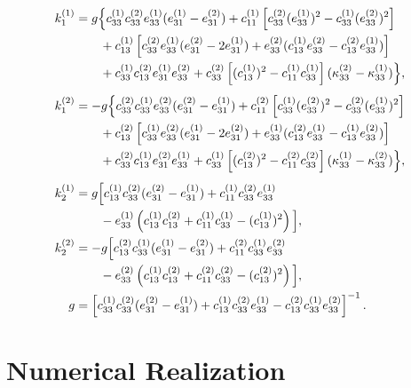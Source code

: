 \begin{align*}
    k_{1}^{(1)} &= g \Big\{
    c_{33}^{(1)} c_{33}^{(2)} e_{33}^{(1)} (e_{31}^{(1)} - e_{31}^{(2)})
    + c_{11}^{(1)} \left[ c_{33}^{(2)} (e_{33}^{(1)})^2 - c_{33}^{(1)} (e_{33}^{(2)})^2 \right]
    \\
    &\qquad + c_{13}^{(1)} \left[
    c_{33}^{(2)} e_{33}^{(1)} (e_{31}^{(2)} - 2 e_{31}^{(1)})
    + e_{33}^{(2)} (c_{13}^{(1)} e_{33}^{(2)} - c_{13}^{(2)} e_{33}^{(1)})
    \right]
    \\
    &\qquad + c_{33}^{(1)} c_{13}^{(2)} e_{31}^{(1)} e_{33}^{(2)}
    + c_{33}^{(2)} \left[ (c_{13}^{(1)})^2 - c_{11}^{(1)} c_{33}^{(1)} \right]
    (\kappa_{33}^{(2)} - \kappa_{33}^{(1)})
    \Big\},
    \\[1ex]
    k_{1}^{(2)} &= -g \Big\{
    c_{33}^{(2)} c_{33}^{(1)} e_{33}^{(2)} (e_{31}^{(2)} - e_{31}^{(1)})
    + c_{11}^{(2)} \left[ c_{33}^{(1)} (e_{33}^{(2)})^2 - c_{33}^{(2)} (e_{33}^{(1)})^2 \right]
    \\
    &\qquad + c_{13}^{(2)} \left[
    c_{33}^{(1)} e_{33}^{(2)} (e_{31}^{(1)} - 2 e_{31}^{(2)})
    + e_{33}^{(1)} (c_{13}^{(2)} e_{33}^{(1)} - c_{13}^{(1)} e_{33}^{(2)})
    \right]
    \\
    &\qquad + c_{33}^{(2)} c_{13}^{(1)} e_{31}^{(2)} e_{33}^{(1)}
    + c_{33}^{(1)} \left[ (c_{13}^{(2)})^2 - c_{11}^{(2)} c_{33}^{(2)} \right]
    (\kappa_{33}^{(1)} - \kappa_{33}^{(2)})
    \Big\},
    \\[1ex]
    k_{2}^{(1)} &= g \Big[
    c_{13}^{(1)} c_{33}^{(2)} (e_{31}^{(2)} - e_{31}^{(1)})
    + c_{11}^{(1)} c_{33}^{(2)} e_{33}^{(1)} \notag \\
    &\qquad - e_{33}^{(1)} \left( c_{13}^{(1)} c_{13}^{(2)} + c_{11}^{(1)} c_{33}^{(1)} - (c_{13}^{(1)})^2 \right)
    \Big],
    \\
    k_{2}^{(2)} &= -g \Big[
    c_{13}^{(2)} c_{33}^{(1)} (e_{31}^{(1)} - e_{31}^{(2)})
    + c_{11}^{(2)} c_{33}^{(1)} e_{33}^{(2)} \notag \\
    &\qquad - e_{33}^{(2)} \left( c_{13}^{(1)} c_{13}^{(2)} + c_{11}^{(2)} c_{33}^{(2)} - (c_{13}^{(2)})^2 \right)
    \Big],
    \\
    g &= \left[
    c_{33}^{(1)} c_{33}^{(2)} (e_{31}^{(2)} - e_{31}^{(1)})
    + c_{13}^{(1)} c_{33}^{(2)} e_{33}^{(1)}
    - c_{13}^{(2)} c_{33}^{(1)} e_{33}^{(2)}
    \right]^{-1}. \label{AdluckyEq_g}
\end{align*}

\section{Numerical Realization}

